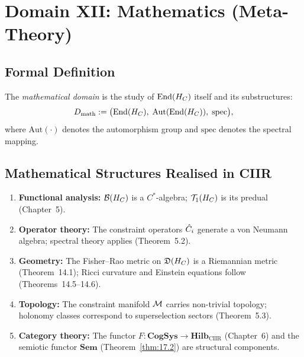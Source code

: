 \section{Domain XII: Mathematics (Meta-Theory)}
\label{sec:ch18:math}

\subsection{Formal Definition}

\begin{definition}\label{def:18.4}
The \emph{mathematical domain} is the study of $\mathrm{End}(H_C)$
itself and its substructures:
\[
  D_{\mathrm{math}} := \bigl(\mathrm{End}(H_C),\;
  \mathrm{Aut}(\mathrm{End}(H_C)),\;
  \mathrm{spec}\bigr),
\]
where $\mathrm{Aut}(\cdot)$ denotes the automorphism group and
$\mathrm{spec}$ denotes the spectral mapping.
\end{definition}

\subsection{Mathematical Structures Realised in CIIR}

\begin{enumerate}
  \item \textbf{Functional analysis:} $\mathcal{B}(H_C)$ is a $C^*$-algebra;
        $\mathcal{T}_1(H_C)$ is its predual (Chapter~5).
  \item \textbf{Operator theory:} The constraint operators $\hat{C}_i$
        generate a von Neumann algebra; spectral theory applies
        (Theorem~5.2).
  \item \textbf{Geometry:} The Fisher--Rao metric on
        $\mathfrak{D}(H_C)$ is a Riemannian metric
        (Theorem~14.1); Ricci curvature and Einstein equations follow
        (Theorems~14.5--14.6).
  \item \textbf{Topology:} The constraint manifold $\mathcal{M}$ carries
        non-trivial topology; holonomy classes correspond to
        superselection sectors (Theorem~5.3).
  \item \textbf{Category theory:} The functor $F : \mathbf{CogSys}
        \to \mathbf{Hilb}_{\mathrm{CIIR}}$ (Chapter~6) and the
        semiotic functor $\mathbf{Sem}$ (Theorem~\ref{thm:17.2})
        are structural components.
\end{enumerate}


